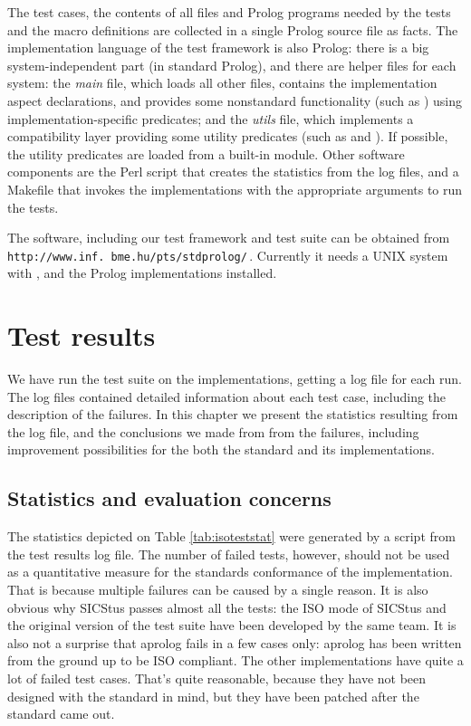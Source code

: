 \documentclass[draft]{llncs}%
\begin{document}
The test cases, the contents of all files and Prolog programs needed by the
tests and the macro definitions are collected in a single Prolog source file
as facts. The implementation language of the test framework is also Prolog:
there is a big system-independent part (in standard Prolog),
and there are helper files
for each system: the \emph{main} file, which loads all other files,
contains the implementation aspect declarations, and provides some
nonstandard functionality (such as )
using implementation-specific predicates; and the \emph{utils} file, which
implements a compatibility layer providing some utility predicates (such as
 and ). If
possible, the utility predicates are loaded from a built-in module.
Other software components are the Perl
script that creates the statistics from the log files, and a Makefile
that invokes the implementations with the appropriate arguments to run the
tests.

The software, including our test framework and test suite can be obtained
from \texttt{http://www.\allowbreak inf\allowbreak .\allowbreak
bme.hu/\homedir pts/stdprolog/}\,. Currently it needs a UNIX system with
,  and the Prolog implementations installed.

\section{Test results}

We have run the test suite on the implementations, getting a log file for
each run. The log files contained detailed information about each test case,
including the description of the failures. In this chapter we present the
statistics resulting from the log file, and the conclusions we made from from
the failures, including improvement possibilities for the both the standard
and its implementations.

\subsection{Statistics and evaluation concerns}

The statistics depicted on Table \ref{tab:isoteststat}
were generated by a script from the test results log file. The number of
failed tests, however, should not be used as a quantitative measure for the
standards conformance of the implementation. That is because multiple failures
can be caused by a single reason. It is also obvious why SICStus passes
almost all the tests: the ISO mode of SICStus
and the original version of the test suite have been developed by the same team.
It is also not a surprise that aprolog fails in a few cases only: aprolog has
been written from the ground up to be ISO compliant. The other
implementations have quite a lot of failed test cases. That's quite
reasonable, because they have not been designed with the standard in mind,
but they have been patched after the standard came out.
\end{document}
